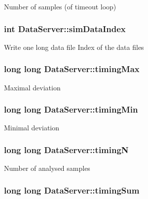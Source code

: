 Number of samples (of timeout loop) \hypertarget{classDataServer_a85f6bfc815d5da78904704e04f58de4a}{
\subsubsection[{sim\-Data\-Index}]{\setlength{\rightskip}{0pt plus 5cm}int Data\-Server\-::sim\-Data\-Index}}\label{classDataServer_a85f6bfc815d5da78904704e04f58de4a}
Write one long data file Index of the data files \hypertarget{classDataServer_ad02c5071511d4abd77be83a3bd74284f}{
\subsubsection[{timing\-Max}]{\setlength{\rightskip}{0pt plus 5cm}long long Data\-Server\-::timing\-Max\hspace{0.3cm}{\ttfamily [private]}}}\label{classDataServer_ad02c5071511d4abd77be83a3bd74284f}
Maximal deviation \hypertarget{classDataServer_a271a282c615df76055fa1c2e83dbd3ab}{
\subsubsection[{timing\-Min}]{\setlength{\rightskip}{0pt plus 5cm}long long Data\-Server\-::timing\-Min\hspace{0.3cm}{\ttfamily [private]}}}\label{classDataServer_a271a282c615df76055fa1c2e83dbd3ab}
Minimal deviation \hypertarget{classDataServer_abc58efaf6db25b7e8160a3adf62590af}{
\subsubsection[{timing\-N}]{\setlength{\rightskip}{0pt plus 5cm}long long Data\-Server\-::timing\-N\hspace{0.3cm}{\ttfamily [private]}}}\label{classDataServer_abc58efaf6db25b7e8160a3adf62590af}
Number of analysed samples \hypertarget{classDataServer_af821fc16f79698b3986813f7fce05cc1}{
\subsubsection[{timing\-Sum}]{\setlength{\rightskip}{0pt plus 5cm}long long Data\-Server\-::timing\-Sum\hspace{0.3cm}{\ttfamily [private]}}}\label{classDataServer_af821fc16f79698b3986813f7fce05cc1}
